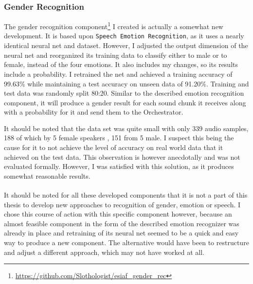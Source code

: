 \subsubsection{Gender Recognition}
\label{main:components:gender}
The gender recognition component\footnote{\url{https://github.com/Slothologist/esiaf_gender_rec}} I created is actually a somewhat new development.
It is based upon \texttt{Speech Emotion Recognition}, as it uses a nearly identical neural net and dataset.
However, I adjusted the output dimension of the neural net and reorganized its training data to classify either to male or to female, instead of the four emotions.
It also includes my changes, so its results include a probability.
I retrained the net and achieved a training accuracy of 99.63\% while maintaining a test accuracy on unseen data of 91.20\%.
Training and test data was randomly split 80:20.
Similar to the described emotion recognition component, it will produce a gender result for each sound chunk it receives along with a probability for it and send them to the Orchestrator.

It should be noted that the data set was quite small with only 339 audio samples, 188 of which by 5 female speakers , 151 from 5 male.
I suspect this being the cause for it to not achieve the level of accuracy on real world data that it achieved on the test data.
This observation is however anecdotally and was not evaluated formally.
However, I was satisfied with this solution, as it produces somewhat reasonable results.
\\\\
It should be noted for all these developed components that it is not a part of this thesis to develop new approaches to recognition of gender, emotion or speech.
I chose this course of action with this specific component however, because an almost feasible component in the form of the described emotion recognizer was already in place and retraining of its neural net seemed to be a quick and easy way to produce a new component.
The alternative would have been to restructure and adjust a different approach, which may not have worked at all.







